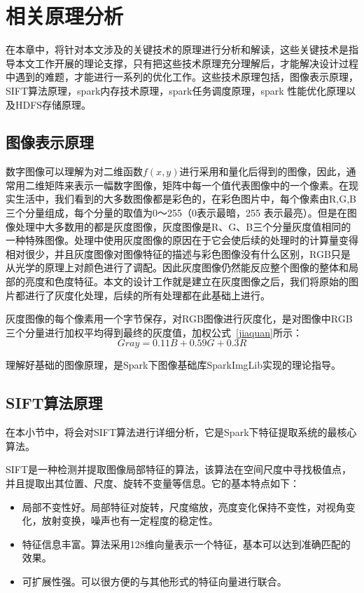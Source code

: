 ﻿\chapter{相关原理分析}
在本章中，将针对本文涉及的关键技术的原理进行分析和解读，这些关键技术是指导本文工作开展的理论支撑，只有把这些技术原理充分理解后，才能解决设计过程中遇到的难题，才能进行一系列的优化工作。这些技术原理包括，图像表示原理，SIFT算法原理，spark内存技术原理，spark任务调度原理，spark 性能优化原理以及HDFS存储原理。
\section{图像表示原理}
数字图像可以理解为对二维函数$f(x,y)$进行采用和量化后得到的图像，因此，通常用二维矩阵来表示一幅数字图像，矩阵中每一个值代表图像中的一个像素。在现实生活中，我们看到的大多数图像都是彩色的，在彩色图片中，每个像素由R,G,B三个分量组成，每个分量的取值为0～255（0表示最暗，255 表示最亮）。但是在图像处理中大多数用的都是灰度图像，灰度图像是R、G、B三个分量灰度值相同的一种特殊图像。处理中使用灰度图像的原因在于它会使后续的处理时的计算量变得相对很少，并且灰度图像对图像特征的描述与彩色图像没有什么区别，RGB只是从光学的原理上对颜色进行了调配。因此灰度图像仍然能反应整个图像的整体和局部的亮度和色度特征。本文的设计工作就是建立在灰度图像之后，我们将原始的图片都进行了灰度化处理，后续的所有处理都在此基础上进行。

灰度图像的每个像素用一个字节保存，对RGB图像进行灰度化，是对图像中RGB三个分量进行加权平均得到最终的灰度值，加权公式~\ref{jiaquan}所示：
\begin{equation}\label{jiaquan}
 Gray = 0.11B + 0.59G + 0.3R
\end{equation}

理解好基础的图像原理，是Spark下图像基础库SparkImgLib实现的理论指导。
\section{SIFT算法原理}
\label{sec:sift}
在本小节中，将会对SIFT算法进行详细分析，它是Spark下特征提取系统的最核心算法。

SIFT是一种检测并提取图像局部特征的算法，该算法在空间尺度中寻找极值点，并且提取出其位置、尺度、旋转不变量等信息。它的基本特点如下：
\begin{itemize}
\item 局部不变性好。局部特征对旋转，尺度缩放，亮度变化保持不变性，对视角变化，放射变换，噪声也有一定程度的稳定性。
\item 特征信息丰富。算法采用128维向量表示一个特征，基本可以达到准确匹配的效果。
\item 可扩展性强。可以很方便的与其他形式的特征向量进行联合。
\end{itemize}

